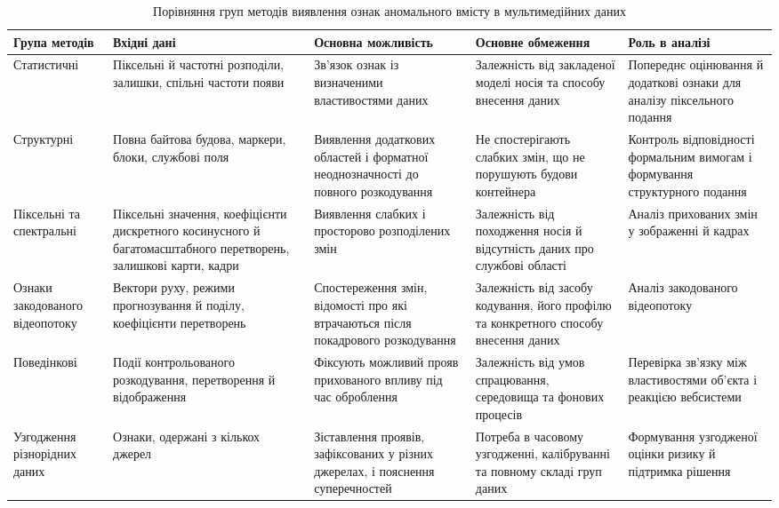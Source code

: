 \begin{table}[H]
\caption{Порівняння груп методів виявлення ознак аномального вмісту в мультимедійних даних}
\label{tab:detection_comparison}
\centering
\scriptsize
\begin{tabularx}{\textwidth}{>{\raggedright\arraybackslash}p{}>{\raggedright\arraybackslash}p{}>{\raggedright\arraybackslash}p{}YY}
\toprule
\textbf{Група методів} & \textbf{Вхідні дані} & \textbf{Основна можливість} & \textbf{Основне обмеження} & \textbf{Роль в аналізі} \\
\midrule
Статистичні & Піксельні й частотні розподіли, залишки, спільні частоти появи & Зв’язок ознак із визначеними властивостями даних & Залежність від закладеної моделі носія та способу внесення даних & Попереднє оцінювання й додаткові ознаки для аналізу піксельного подання \\
Структурні & Повна байтова будова, маркери, блоки, службові поля & Виявлення додаткових областей і форматної неоднозначності до повного розкодування & Не спостерігають слабких змін, що не порушують будови контейнера & Контроль відповідності формальним вимогам і формування структурного подання \\
Піксельні та спектральні & Піксельні значення, коефіцієнти дискретного косинусного й багатомасштабного перетворень, залишкові карти, кадри & Виявлення слабких і просторово розподілених змін & Залежність від походження носія й відсутність даних про службові області & Аналіз прихованих змін у зображенні й кадрах \\
Ознаки закодованого відеопотоку & Вектори руху, режими прогнозування й поділу, коефіцієнти перетворень & Спостереження змін, відомості про які втрачаються після покадрового розкодування & Залежність від засобу кодування, його профілю та конкретного способу внесення даних & Аналіз закодованого відеопотоку \\
Поведінкові & Події контрольованого розкодування, перетворення й відображення & Фіксують можливий прояв прихованого впливу під час оброблення & Залежність від умов спрацювання, середовища та фонових процесів & Перевірка зв’язку між властивостями об’єкта і реакцією вебсистеми \\
Узгодження різнорідних даних & Ознаки, одержані з кількох джерел & Зіставлення проявів, зафіксованих у різних джерелах, і пояснення суперечностей & Потреба в часовому узгодженні, калібруванні та повному складі груп даних & Формування узгодженої оцінки ризику й підтримка рішення \\
\bottomrule
\end{tabularx}
\end{table}

